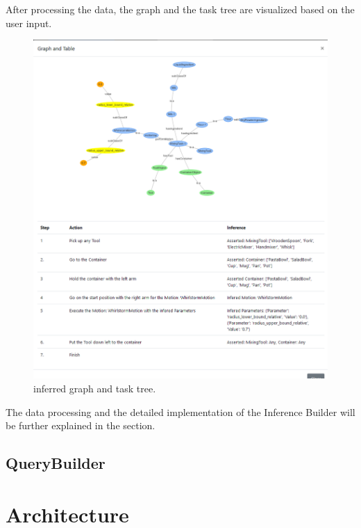 After processing the data, the graph and the task tree are visualized based on the user input.

\begin{figure}[H]
    \includegraphics[scale=0.5]{Graphics/new_inference_graph.png}
    \caption{inferred graph and task tree.}
    \label{fig:graph_inferred}
\end{figure}

The data processing and the detailed implementation of the Inference Builder will be further explained in the  section.
\subsection{QueryBuilder}



\section{Architecture}
\label{sec:Architecture}

